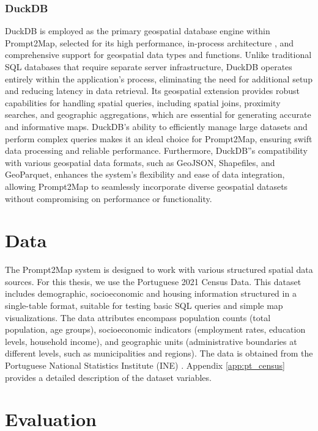 \subsubsection{DuckDB}
DuckDB is employed as the primary geospatial database engine within Prompt2Map, selected for its high performance, in-process architecture \cite{raasveldt_duckdb_2019},  and comprehensive support for geospatial data types and functions. Unlike traditional SQL databases that require separate server infrastructure, DuckDB operates entirely within the application's process, eliminating the need for additional setup and reducing latency in data retrieval. Its geospatial extension provides robust capabilities for handling spatial queries, including spatial joins, proximity searches, and geographic aggregations, which are essential for generating accurate and informative maps. DuckDB's ability to efficiently manage large datasets and perform complex queries makes it an ideal choice for Prompt2Map, ensuring swift data processing and reliable performance. Furthermore, DuckDB''s compatibility with various geospatial data formats, such as GeoJSON, Shapefiles, and GeoParquet, enhances the system's flexibility and ease of data integration, allowing Prompt2Map to seamlessly incorporate diverse geospatial datasets without compromising on performance or functionality.


\section{Data}
The Prompt2Map system is designed to work with various structured spatial data sources. For this thesis, we use the Portuguese 2021 Census Data. This dataset includes demographic, socioeconomic and housing information structured in a single-table format, suitable for testing basic SQL queries and simple map visualizations. The data attributes encompass population counts (total population, age groups), socioeconomic indicators (employment rates, education levels, household income), and geographic units (administrative boundaries at different levels, such as municipalities and regions). The data is obtained from the Portuguese National Statistics Institute (INE) \cite{INE2021Census}. Appendix \ref{app:pt_census} provides a detailed description of the dataset variables.

\section{Evaluation}

